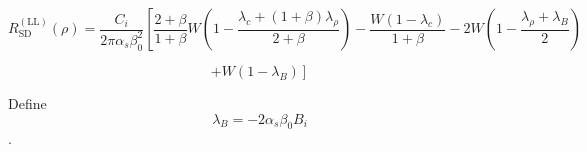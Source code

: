 \begin{equation}
R_{\mathrm{SD}}^{(\mathrm{LL})}(\rho)=\frac{C_{i}}{2 \pi \alpha_{s} \beta_{0}^{2}}\left[\frac{2+\beta}{1+\beta} W\left(1-\frac{\lambda_{c}+(1+\beta) \lambda_{\rho}}{2+\beta}\right)-\frac{W\left(1-\lambda_{c}\right)}{1+\beta}-2 W\left(1-\frac{\lambda_{\rho}+\lambda_{B}}{2}\right)\right.
\end{equation}


\begin{equation}
\left.+W\left(1-\lambda_{B}\right)\right]
\end{equation}

Define 
\begin{equation}
\lambda_{B}=-2 \alpha_{s} \beta_{0} B_{i}
\end{equation}.







